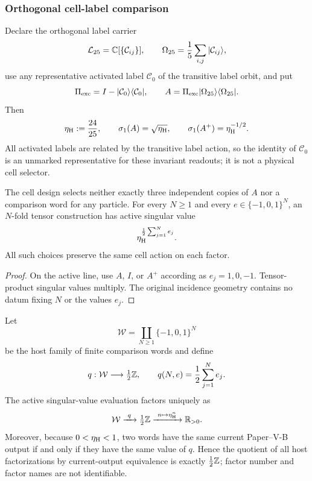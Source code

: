 \documentclass[11pt,a4paper]{article}
\newcommand{\etaH}{\eta_{\rm H}}
\begin{document}
\subsubsection{Orthogonal cell-label comparison}

Declare the orthogonal label carrier
\[
\mathcal L_{25}=\mathbb{C}[\{\mathcal C_{ij}\}],
\qquad
\Omega_{25}=\frac15\sum_{i,j}|\mathcal C_{ij}\rangle,
\]
use any representative activated label \(\mathcal C_0\) of the transitive
label orbit, and put
\[
\Pi_{\rm exc}=I-|\mathcal C_0\rangle\langle\mathcal C_0|,
\qquad
A=\Pi_{\rm exc}|\Omega_{25}\rangle\langle\Omega_{25}|.
\]
Then
\[
\etaH:=\frac{24}{25},
\qquad
\sigma_1(A)=\sqrt{\etaH},
\qquad
\sigma_1(A^+)=\etaH^{-1/2}.
\]
All activated labels are related by the transitive label action, so the
identity of \(\mathcal C_0\) is an unmarked representative for these invariant
readouts; it is not a physical cell selector.

\begin{theorem}
\label{p6:thm:comparison-factor-no-go}
The cell design selects neither exactly three independent copies of \(A\)
nor a comparison word for any particle.  For every \(N\ge1\) and every
\(e\in\{-1,0,1\}^N\), an \(N\)-fold tensor construction has active singular
value
\[
\etaH^{\frac12\sum_{j=1}^Ne_j}.
\]
All such choices preserve the same cell action on each factor.
\end{theorem}

\begin{proof}
On the active line, use \(A\), \(I\), or \(A^+\) according as
\(e_j=1,0,-1\).  Tensor-product singular values multiply.  The original
incidence geometry contains no datum fixing \(N\) or the values \(e_j\).
\end{proof}

\begin{theorem}
\label{p6:thm:comparison-output-factorization}
Let
\[
\mathcal W
=
\coprod_{N\ge1}\{-1,0,1\}^{N}
\]
be the host family of finite comparison words and define
\[
q:\mathcal W\longrightarrow\tfrac12\mathbb{Z},
\qquad
q(N,e)=\frac12\sum_{j=1}^{N}e_j.
\]
The active singular-value evaluation factors uniquely as
\[
\mathcal W\xrightarrow{\ q\ }\tfrac12\ZZ
\xrightarrow{\ n\mapsto\etaH^n\ }\RR_{>0}.
\]
Moreover, because \(0<\etaH<1\), two words have the same current Paper--V-B
output if and only if they have the same value of \(q\).  Hence the quotient
of all host factorizations by current-output equivalence is exactly
\(\tfrac12\mathbb{Z}\); factor number and factor names are not identifiable.
\end{theorem}
\end{document}
